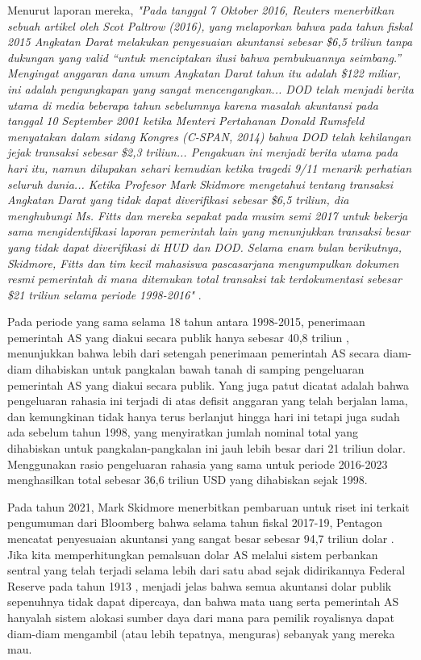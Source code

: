 \documentclass[10pt,twocolumn,letterpaper]{article}
\begin{document}
Menurut laporan mereka, \textit{"Pada tanggal 7 Oktober 2016, Reuters menerbitkan sebuah artikel oleh Scot Paltrow (2016), yang melaporkan bahwa pada tahun fiskal 2015 Angkatan Darat melakukan penyesuaian akuntansi sebesar \$6,5 triliun tanpa dukungan yang valid “untuk menciptakan ilusi bahwa pembukuannya seimbang.” Mengingat anggaran dana umum Angkatan Darat tahun itu adalah \$122 miliar, ini adalah pengungkapan yang sangat mencengangkan... DOD telah menjadi berita utama di media beberapa tahun sebelumnya karena masalah akuntansi pada tanggal 10 September 2001 ketika Menteri Pertahanan Donald Rumsfeld menyatakan dalam sidang Kongres (C-SPAN, 2014) bahwa DOD telah kehilangan jejak transaksi sebesar \$2,3 triliun... Pengakuan ini menjadi berita utama pada hari itu, namun dilupakan sehari kemudian ketika tragedi 9/11 menarik perhatian seluruh dunia... Ketika Profesor Mark Skidmore mengetahui tentang transaksi Angkatan Darat yang tidak dapat diverifikasi sebesar \$6,5 triliun, dia menghubungi Ms. Fitts dan mereka sepakat pada musim semi 2017 untuk bekerja sama mengidentifikasi laporan pemerintah lain yang menunjukkan transaksi besar yang tidak dapat diverifikasi di HUD dan DOD. Selama enam bulan berikutnya, Skidmore, Fitts dan tim kecil mahasiswa pascasarjana mengumpulkan dokumen resmi pemerintah di mana ditemukan total transaksi tak terdokumentasi sebesar \$21 triliun selama periode 1998-2016"} \cite{12}.

Pada periode yang sama selama 18 tahun antara 1998-2015, penerimaan pemerintah AS yang diakui secara publik hanya sebesar 40,8 triliun \cite{15}, menunjukkan bahwa lebih dari setengah penerimaan pemerintah AS secara diam-diam dihabiskan untuk pangkalan bawah tanah di samping pengeluaran pemerintah AS yang diakui secara publik. Yang juga patut dicatat adalah bahwa pengeluaran rahasia ini terjadi di atas defisit anggaran yang telah berjalan lama, dan kemungkinan tidak hanya terus berlanjut hingga hari ini tetapi juga sudah ada sebelum tahun 1998, yang menyiratkan jumlah nominal total yang dihabiskan untuk pangkalan-pangkalan ini jauh lebih besar dari 21 triliun dolar. Menggunakan rasio pengeluaran rahasia yang sama untuk periode 2016-2023 menghasilkan total sebesar 36,6 triliun USD yang dihabiskan sejak 1998.

Pada tahun 2021, Mark Skidmore menerbitkan pembaruan untuk riset ini terkait pengumuman dari Bloomberg bahwa selama tahun fiskal 2017-19, Pentagon mencatat penyesuaian akuntansi yang sangat besar sebesar 94,7 triliun dolar \cite{17,18}. Jika kita memperhitungkan pemalsuan dolar AS melalui sistem perbankan sentral yang telah terjadi selama lebih dari satu abad sejak didirikannya Federal Reserve pada tahun 1913 \cite{37}, menjadi jelas bahwa semua akuntansi dolar publik sepenuhnya tidak dapat dipercaya, dan bahwa mata uang serta pemerintah AS hanyalah sistem alokasi sumber daya dari mana para pemilik royalisnya dapat diam-diam mengambil (atau lebih tepatnya, menguras) sebanyak yang mereka mau.
\end{document}
